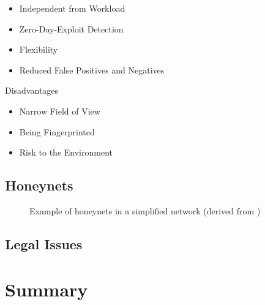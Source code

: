 \begin{itemize}
    \item Independent from Workload
    \item Zero-Day-Exploit Detection
    \item Flexibility
    \item Reduced False Positives and Negatives
\end{itemize}

Disadvantages

\begin{itemize}
    \item Narrow Field of View
    \item Being Fingerprinted
    \item Risk to the Environment
\end{itemize}

\subsection{Honeynets}

\begin{figure}[h]
    \centering
    
    \caption{Example of honeynets in a simplified network (derived from \cite{Spitzner2003})}
    \label{fig:honeynet-example}
\end{figure}

\cite{Spitzner2003}

\subsection{Legal Issues}

\cite{Spitzner2003}

\section{Summary}

